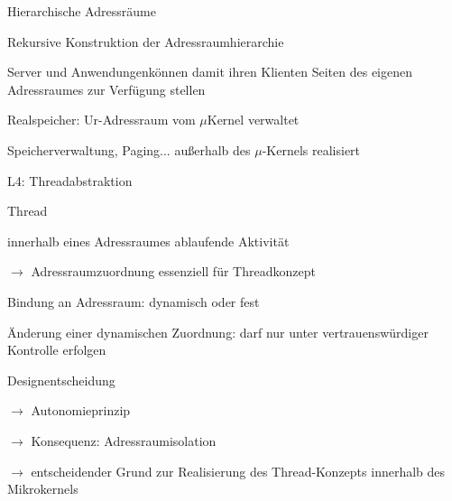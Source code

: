 \documentclass[a4paper]{article}
\begin{document}
\begin{multicols}{3}
    Hierarchische Adressräume
    \begin{itemize*}
        \item Rekursive Konstruktion der Adressraumhierarchie
        \item Server und Anwendungenkönnen damit ihren Klienten Seiten des eigenen Adressraumes zur Verfügung stellen
        \item Realspeicher: Ur-Adressraum vom $\mu$Kernel verwaltet
        \item Speicherverwaltung, Paging... außerhalb des $\mu$-Kernels realisiert
    \end{itemize*}

    L4: Threadabstraktion
    \begin{itemize*}
        \item Thread
        \begin{itemize*}
            \item innerhalb eines Adressraumes ablaufende Aktivität
            \item[$\rightarrow$] Adressraumzuordnung essenziell für Threadkonzept
            \item Bindung an Adressraum: dynamisch oder fest
            \item Änderung einer dynamischen Zuordnung: darf nur unter vertrauenswürdiger Kontrolle erfolgen
        \end{itemize*}
        \item Designentscheidung
        \begin{itemize*}
            \item[$\rightarrow$] Autonomieprinzip
            \item[$\rightarrow$] Konsequenz: Adressraumisolation
            \item[$\rightarrow$] entscheidender Grund zur Realisierung des Thread-Konzepts innerhalb des Mikrokernels
        \end{itemize*}
    \end{itemize*}


\end{multicols}
\end{document}

